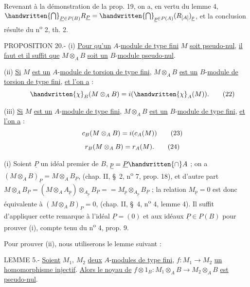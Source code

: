 Revenant à la démonstration de la prop. 19, on a, en vertu du lemme 4, $\handwritten{\bigcap}_{\underline P\in P(B)}R_{\underline P}=\handwritten{\bigcap}_{\underline p\in P(A)}(R_{[A]})_{\underline p}$, et la conclusion résulte du n\textsuperscript{o} 2, th. 2.

PROPOSITION 20.- (i) \uline{Pour qu'un} $A$-\uline{module de type fini} $M$ \uline{soit pseudo-nul}, \uline{il faut et il suffit que} $M\otimes_A B$ \uline{soit un} $B$-\uline{module pseudo-nul}.

(ii) \uline{Si} $M$ \uline{est un} $A$-\uline{module de torsion de type fini}, $M\otimes_A B$ \uline{est un} $B$-\uline{module de torsion de type fini}, \uline{et l'on a} :
\[
\handwritten{\chi}_B(M\otimes_A B)=i(\handwritten{\chi}_A(M)).\tag*{\makebox[0pt][r]{\makebox[\displaywidth][l]{(22)}}}
\]

(iii) \uline{Si} $M$ \uline{est un} $A$-\uline{module de type fini}, $M\otimes_A B$ \uline{est un} $B$-\uline{module de type fini}, \uline{et l'on a} :
\[
c_B(M\otimes_A B)=i(c_A(M))\tag*{\makebox[0pt][r]{\makebox[\displaywidth][l]{(23)}}}
\]
\[
r_B(M\otimes_A B)=r_A(M).\tag*{\makebox[0pt][r]{\makebox[\displaywidth][l]{(24)}}}
\]

(i) Soient $\underline P$ un idéal premier de $B$, $\underline p=\underline P\handwritten{\cap} A$ ; on a $(M\otimes_A B)_{\underline P}=M\otimes_A B_{\underline P}$, (chap. II, \S~2, n\textsuperscript{o} 7, prop. 18), et d'autre part $M\otimes_A B_{\underline P}=(M\otimes_A A_{\underline p})\otimes_{A_{\underline p}}B_{\underline P}={}=M_{\underline p}\otimes_{A_{\underline p}}B_{\underline P}$ ; la relation $M_{\underline p}=0$ est donc équivalente à $(M\otimes_A B)_{\underline P}=0$, (chap. II, \S~4, n\textsuperscript{o} 4, lemme 4). Il suffit d'appliquer cette remarque à l'idéal $\underline P=(0)$ et aux idéaux $\underline P\in P(B)$ pour prouver (i), compte tenu du n\textsuperscript{o} 4, prop. 9.

Pour prouver (ii), nous utiliserons le lemme suivant :

LEMME 5.- \uline{Soient} $M_1$, $M_2$ \uline{deux} $A$-\uline{modules de type fini}, $f:M_1\longrightarrow M_2$ \uline{un homomorphisme injectif}. \uline{Alors le noyau de} $f\otimes 1_B:M_1\otimes_A B\longrightarrow M_2\otimes_A B$ \uline{est pseudo-nul}.


